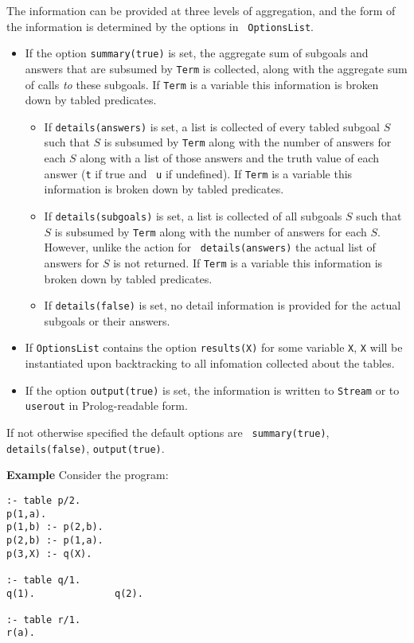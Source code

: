 \begin{description}
The information can be provided at three levels of aggregation, and
the form of the information is determined by the options in {\tt
  OptionsList}.
%
\begin{itemize}
\item If the option {\tt summary(true)} is set, the aggregate sum
  of subgoals and answers that are subsumed by {\tt Term} is
  collected, along with the aggregate sum of calls {\it to} these
  subgoals.  If {\tt Term} is a variable this information is broken
  down by tabled predicates.
%
\begin{itemize}
\item If {\tt details(answers)} is set, a list is collected of every
  tabled subgoal $S$ such that $S$ is subsumed by {\tt Term} along
  with the number of answers for each $S$ along with a list of those
  answers and the truth value of each answer ({\tt t} if true and {\tt
    u} if undefined).  If {\tt Term} is a variable this information is
  broken down by tabled predicates.
%
\item If {\tt details(subgoals)} is set, a list is collected of all
  subgoals $S$ such that $S$ is subsumed by {\tt Term} along with the
  number of answers for each $S$.  However, unlike the action for {\tt
    details(answers)} the actual list of answers for $S$ is not
  returned.  If {\tt Term} is a variable this information is broken
  down by tabled predicates.
%
\item If {\tt details(false)} is set, no detail information is
  provided for the actual subgoals or their answers.
\end{itemize}
%
\item If {\tt OptionsList} contains the option {\tt results(X)} for
  some variable {\tt X}, {\tt X} will be instantiated upon
  backtracking to all infomation collected about the tables.
%
\item If the option {\tt output(true)} is set, the information is
  written to {\tt Stream} or to {\tt userout} in Prolog-readable form.
\end{itemize}
%
If not otherwise specified the default options are {\tt
  summary(true)}, {\tt details(false)}, {\tt output(true)}.

{\bf Example}  Consider the program:
\begin{verbatim}
:- table p/2.
p(1,a).
p(1,b) :- p(2,b).
p(2,b) :- p(1,a).
p(3,X) :- q(X).

:- table q/1.
q(1).              q(2).

:- table r/1.
r(a).


\end{verbatim}
\end{description}

